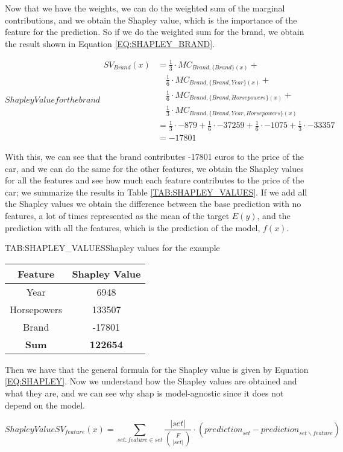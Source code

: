 Now that we have the weights, we can do the weighted sum of the marginal contributions, and we obtain the Shapley value, which is the importance of the feature for the prediction. So if we do the weighted sum for the brand, we obtain the result shown in Equation \ref{EQ:SHAPLEY_BRAND}.

\begin{equation}[EQ:SHAPLEY_BRAND]{Shapley Value for the brand}
    \begin{split}
        SV_{Brand}(x) & = \frac{1}{3} \cdot MC_{Brand, \{Brand\}(x)} + \\ 
        & \quad \frac{1}{6} \cdot MC_{Brand, \{Brand, Year\}(x)} + \\ 
        & \quad \frac{1}{6} \cdot MC_{Brand, \{Brand, Horsepowers\}(x)} + \\ 
        & \quad \frac{1}{3} \cdot MC_{Brand, \{Brand, Year, Horsepowers\}(x)} \\
        & = \frac{1}{3} \cdot -879 + \frac{1}{6} \cdot -37259 + \frac{1}{6} \cdot -1075 + \frac{1}{3} \cdot -33357 \\
        & = -17801
    \end{split}
\end{equation}

With this, we can see that the brand contributes -17801 euros to the price of the car, and we can do the same for the other features, we obtain the Shapley values for all the features and see how much each feature contributes to the price of the car; we summarize the results in Table \ref{TAB:SHAPLEY_VALUES}. If we add all the Shapley values we obtain the difference between the base prediction with no features, a lot of times represented as the mean of the target $E(y)$, and the prediction with all the features, which is the prediction of the model, $f(x)$.
\begin{table}[Shapley Values]{TAB:SHAPLEY_VALUES}{Shapley values for the example}
    \begin{tabular}{|c|c|}
        \hline
        Feature & Shapley Value \\
        \hline
        Year & 6948 \\
        Horsepowers & 133507 \\
        Brand & -17801 \\
        \hline
        \textbf{Sum} & \textbf{122654} \\
        \hline
    \end{tabular}
\end{table}

Then we have that the general formula for the Shapley value is given by Equation \ref{EQ:SHAPLEY}. Now we understand how the Shapley values are obtained and what they are, and we can see why \ac{shap} is model-agnostic since it does not depend on the model.

\begin{equation}[EQ:SHAPLEY]{Shapley Value}
   \boxed{ SV_{feature}(x) = \sum_{{set:feature} \in {set}} \frac{|{set}| }{{F \choose |{set}|}} \cdot ({prediction}_{set} - {prediction}_{{set} \backslash {feature}})}
\end{equation}